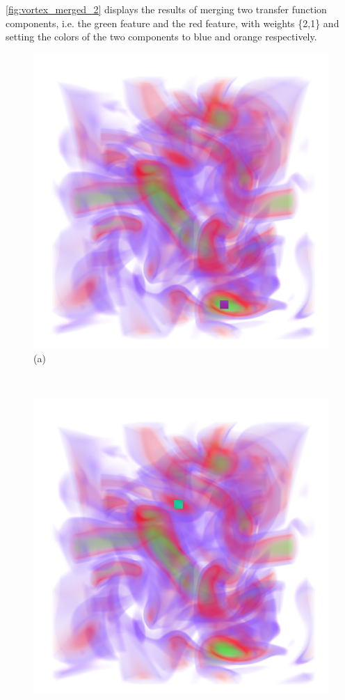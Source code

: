 \documentclass[twoside,twocolumn,10pt]{article}
\begin{document}
\autoref{fig:vortex_merged_2} displays the results of merging two transfer function components, i.e. the green feature and the red feature, with weights \{2,1\} and setting the colors of the two components to blue and orange respectively.

\begin{figure}
	\centering
	\begin{minipage}{.16\textwidth}
		\centering
		\includegraphics[width=1\linewidth]{crop/vortex_selection_green}
		(a)
	\end{minipage}~
	\begin{minipage}{.16\textwidth}
		\centering
		\includegraphics[width=1\linewidth]{crop/vortex_selection_red}

\end{minipage}
\end{figure}
\end{document}
